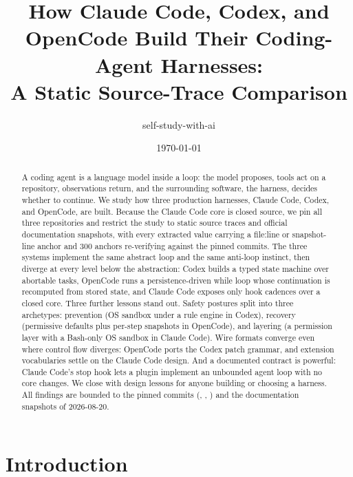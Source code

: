 \documentclass{article}
\title{How Claude Code, Codex, and OpenCode Build Their Coding-Agent Harnesses:\\
A Static Source-Trace Comparison}
\author{self-study-with-ai}
\date{\today}
\newcommand{\codex}[0]{Codex}
\newcommand{\occ}[0]{OpenCode}
\newcommand{\ccc}[0]{Claude Code}
\begin{document}
\maketitle

\begin{abstract}
A coding agent is a language model inside a loop: the model proposes,
tools act on a repository, observations return, and the surrounding
software, the harness, decides whether to continue. We study how three
production harnesses, \ccc{}, \codex{}, and \occ{}, are built. Because
the \ccc{} core is closed source, we pin all three repositories and
restrict the study to static source traces and official documentation
snapshots, with every extracted value carrying a file:line or
snapshot-line anchor and 300 anchors re-verifying against the pinned
commits. The three systems implement the same abstract loop and the same
anti-loop instinct, then diverge at every level below the abstraction:
\codex{} builds a typed state machine over abortable tasks, \occ{} runs a
persistence-driven while loop whose continuation is recomputed from
stored state, and \ccc{} exposes only hook cadences over a closed core.
Three further lessons stand out. Safety postures split into three
archetypes: prevention (OS sandbox under a rule engine in \codex{}),
recovery (permissive defaults plus per-step snapshots in \occ{}), and
layering (a permission layer with a Bash-only OS sandbox in \ccc{}).
Wire formats converge even where control flow diverges: \occ{} ports the
\codex{} patch grammar, and extension vocabularies settle on the
\ccc{} design. And a documented contract is powerful: \ccc{}'s stop hook
lets a plugin implement an unbounded agent loop with no core changes. We
close with design lessons for anyone building or choosing a harness. All
findings are bounded to the pinned commits (,
, ) and the documentation snapshots of
2026-08-20.
\end{abstract}

\section{Introduction}
\end{document}
